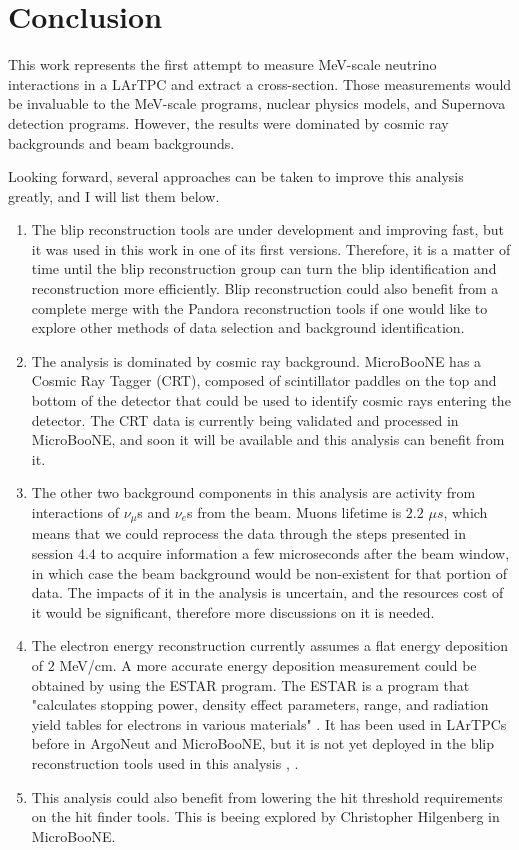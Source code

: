 \section{Conclusion}
This work represents the first attempt to measure MeV-scale neutrino interactions in a LArTPC and extract a cross-section. Those measurements would be invaluable to the MeV-scale programs, nuclear physics models, and Supernova detection programs. 
However, the results were dominated by cosmic ray backgrounds and beam backgrounds. 

Looking  forward, several approaches can be taken to improve this analysis greatly, and I will list them below. 
\begin{enumerate}
 \item The blip reconstruction tools are under development and improving fast, but it was used in this work in one of its first versions. Therefore, it is a matter of time until the blip reconstruction group can turn the blip identification and reconstruction more efficiently. Blip reconstruction could also benefit from a complete merge with the Pandora reconstruction tools if one would like to explore other methods of data selection and background identification.

 \item The analysis is dominated by cosmic ray background. MicroBooNE has a Cosmic Ray Tagger (CRT), composed of scintillator paddles on the top and bottom of the detector that could be used to identify cosmic rays entering the detector. The CRT data is currently being validated and processed in MicroBooNE, and soon it will be available and this analysis can benefit from it. 
 
 \item The other two background components in this analysis are activity from interactions of $\nu_{\mu}$s and $\nu_{e}$s from the beam. Muons lifetime is $2.2$ $\mu s$, which means that we could reprocess the data through the steps presented in session $4.4$ to acquire information a few microseconds after the beam window, in which case the beam background would be non-existent for that portion of data. The impacts of it in the analysis is uncertain, and the resources cost of it would be significant, therefore more discussions on it is needed. 
 
 \item The electron energy reconstruction currently assumes a flat energy deposition of $2$ MeV/cm. A more accurate energy deposition measurement could be obtained by using the ESTAR program. The ESTAR is a program that "calculates stopping power, density effect parameters, range, and radiation yield tables for electrons in various materials" \cite{ESTAR}. It has been used in LArTPCs before in ArgoNeut and MicroBooNE, but it is not yet deployed in the blip reconstruction tools used in this analysis \cite{argoneut_mev}, \cite{microboone_mev}. 
 
 \item This analysis could also benefit from lowering the hit threshold requirements on the hit finder tools. This is beeing explored by Christopher Hilgenberg in MicroBooNE. 
\end{enumerate}
